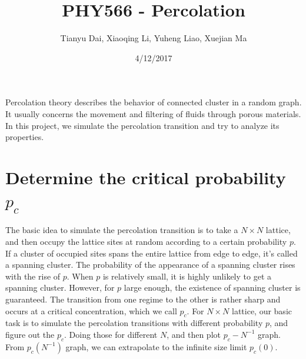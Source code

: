 \documentclass[12pt]{article}
\author{Tianyu Dai, Xiaoqing Li, Yuheng Liao, Xuejian Ma}
\title{PHY566 - Percolation}
\begin{document}
\date{4/12/2017}
\maketitle
Percolation theory describes the behavior of connected cluster in a random graph. It usually concerns the movement and filtering of fluids through porous materials. In this project, we simulate the percolation transition and try to analyze its properties.
\section{Determine the critical probability $p_c$}
The basic idea to simulate the percolation transition is to take a $N\times N$ lattice, and then occupy the lattice sites at random according to a certain probability $p$. If a cluster of occupied sites spans the entire lattice from edge to edge, it's called a spanning cluster. The probability of the appearance of a spanning cluster rises with the rise of $p$. When $p$ is relatively small, it is highly unlikely to get a spanning cluster. However, for $p$ large enough, the existence of spanning cluster is guaranteed. The transition from one regime to the other is rather sharp and occurs at a critical concentration, which we call $p_c$. For $N\times N$ lattice, our basic task is to simulate the percolation transitions with different probability $p$, and figure out the $p_c$. Doing those for different $N$, and then plot $p_c - N^{-1}$ graph. From $p_c(N^{-1})$ graph, we can extrapolate to the infinite size limit $p_c(0)$.\\
\end{document}
